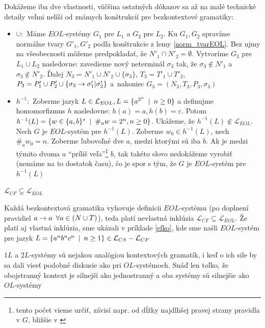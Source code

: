 \begin{dokaz}
Dokážeme iba dve vlastnosti, väčšina ostatných dôkazov sa až na
malé technické detaily veľmi nelíši od známych konštrukcií pre
bezkontextové gramatiky:
\begin{itemize}
\item $\cup :$ Máme $EOL$-systémy $G_{1}$ pre $L_{1}$ a $G_{2}$
pre $L_{2}$. Ku $G_{1},G_{2}$ spravíme normálne tvary
$G'_{1},G'_{2}$ podľa konštrukcie z lemy \ref{norm_tvarEOL}. Bez
ujmy na všeobecnosti môžeme predpokladať, že $N'_{1}\cap
N'_{2}=\emptyset$. Vytvoríme $G_{3}$ pre $L_{1}\cup L_{2}$
nasledovne: zavedieme nový neterminál $\sigma_{3}$ tak, že
$\sigma_{3}\not\in N'_{1}$ \mbox{a $\sigma_{3}\not\in N'_{2}$}.
Ďalej $N_{3}=N'_{1}\cup N'_{2}\cup\{\sigma_{3}\}$,
$T_{3}=T'_{1}\cup T'_{2}$, $P_{3}=P'_{1}\cup
P'_{2}\cup\{\sigma_{3}\rightarrow\sigma'_{1}|\sigma'_{2}\}$ \mbox{a
nakoniec} $G_{3}=(N_{3},T_{3},P_{3},\sigma_{3})$
\item $h^{-1} :$ Zoberme jazyk $L\in\mathcal{L}_{EOL},
L=\{a^{2^n}\enspace |\enspace n\geq0\}$ a definujme homomorfizmus $h$ nasledovne:
$h(a)=a, h(b)=\varepsilon$. Potom $h^{-1}(L)=\{w\in\{a,b\}^*\enspace |\enspace
\#_a w=2^n,n\geq0\}$. Ukážeme, že
$h^{-1}(L)\not\in\mathcal{L}_{EOL}$. Nech $G$ je $EOL$-systém pre
$h^{-1}(L)$. Zoberme $w_0\in h^{-1}(L)$, nech $\#_a w_0=n$.
Zoberme ľubovoľné dve $a$, medzi ktorými sú iba $b$. Ak je medzi
týmito dvoma $a$ ``príliš veľa''\footnote{tento počet vieme určiť,
závisí napr. od dĺžky najdlhšej pravej strany pravidla v $G$,
bližšie v \cite{clos}} $b$, tak takéto slovo nedokážeme vyrobiť
(nemáme na to dostatok času), čo je spor s tým, že $G$ je
$EOL$-systém pre $h^{-1}(L)$
\end{itemize}
\end{dokaz}

\begin{veta}
$\mathcal{L}_{CF}\subsetneq\mathcal{L}_{EOL}$
\end{veta}

\begin{dokaz}
Každá bezkontextová gramatika vyhovuje definícii $EOL$-systému (po
doplnení pravidiel $a\rightarrow a\enspace\forall a\in(N\cup T)$), teda platí
nevlastná inklúzia $\mathcal{L}_{CF}\subseteq\mathcal{L}_{EOL}$.
Že platí aj vlastná inklúzia, sme ukázali v príklade \ref{efko},
kde sme našli $EOL$-systém pre jazyk $L=\{a^{n}b^{n}c^{n}\enspace |\enspace
n\geq1\}\in\mathcal{L}_{CS} - \mathcal{L}_{CF}$
\end{dokaz}

\begin{poznamka}
$1L$ a $2L$-systémy sú nejakou analógiou kontextových gramatík, i
keď o ich sile by sa dali viesť podobné diskusie ako pri
$OL$-systémoch. Snáď len toľko, že obojstranný kontext je silnejší
ako jednostranný a oba systémy sú silnejšie ako $OL$-systémy
\end{poznamka}

